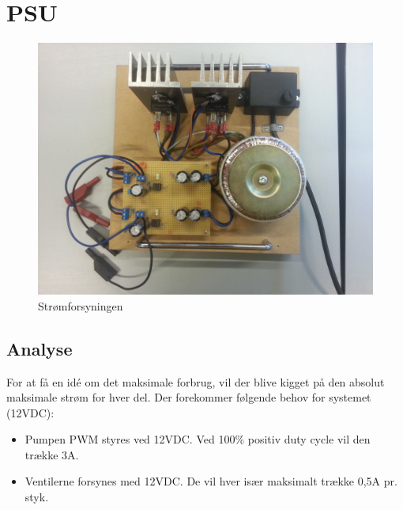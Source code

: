 \section{PSU}
\begin{figure}[H]
	\centering
	\includegraphics[scale=0.1]{../Hardware/PSU/PSU}
	\caption{Strømforsyningen}
	\label{photo:PSU}
\end{figure}

\subsection{Analyse}
For at få en idé om det maksimale forbrug, vil der blive kigget på den absolut maksimale strøm for hver del. Der forekommer følgende behov for systemet (12VDC):
\begin{itemize}
\item Pumpen PWM styres ved 12VDC. Ved 100\% positiv duty cycle vil den trække 3A.
\item Ventilerne forsynes med 12VDC. De vil hver især maksimalt trække 0,5A pr. styk.
\end{itemize}

